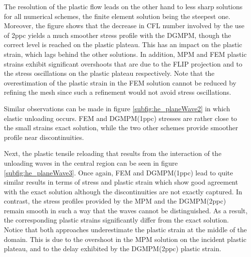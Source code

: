 The resolution of the plastic flow leads on the other hand to less sharp solutions for all numerical schemes, the finite element solution being the steepest one.
Moreover, the figure shows that the decrease in CFL number involved by the use of 2ppc yields a much smoother stress profile with the DGMPM, though the correct level is reached on the plastic plateau.
This has an impact on the plastic strain, which lags behind the other solutions.
In addition, MPM and FEM plastic strains exhibit significant overshoots that are due to the FLIP projection \cite{Thesis} and to the stress oscillations on the plastic plateau respectively.
Note that the overestimation of the plastic strain in the FEM solution cannot be reduced by refining the mesh since such a refinement would not avoid stress oscillations.

Similar observations can be made in figure \ref{subfig:he_planeWave2} in which elastic unloading occurs.
FEM and DGMPM(1ppc) stresses are rather close to the small strains exact solution, while the two other schemes provide smoother profile near discontinuities.

Next, the plastic tensile reloading that results from the interaction of the unloading waves in the central region can be seen in figure \ref{subfig:he_planeWave3}.
Once again, FEM and DGMPM(1ppc) lead to quite similar results in terms of stress and plastic strain which show good agreement with the exact solution although the discontinuities are not exactly captured.
In contrast, the stress profiles provided by the MPM and the DGMPM(2ppc) remain smooth in such a way that the waves cannot be distinguished.
As a result, the corresponding plastic strains significantly differ from the exact solution.
Notice that both approaches underestimate the plastic strain at the middle of the domain.
This is due to the overshoot in the MPM solution on the incident plastic plateau, and to the delay exhibited by the DGMPM(2ppc) plastic strain.

